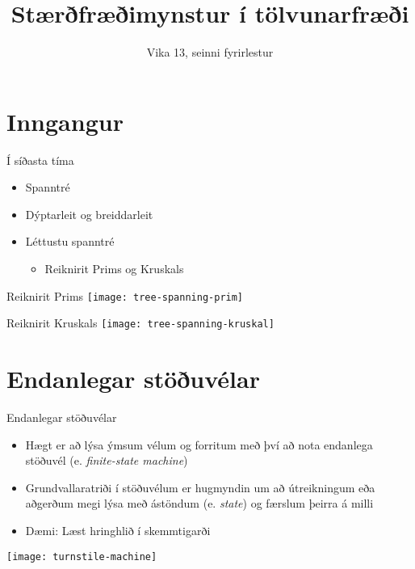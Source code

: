 \documentclass{beamer}
\title{Stærðfræðimynstur í tölvunarfræði}
\subtitle{Vika 13, seinni fyrirlestur}
\begin{document}
\begin{frame}
\titlepage
\end{frame}


\section{Inngangur}

\begin{frame}{Í síðasta tíma}
\begin{itemize}
 \item Spanntré
 \item Dýptarleit og breiddarleit
 \item Léttustu spanntré
 \begin{itemize}
  \item Reiknirit Prims og Kruskals
 \end{itemize}
\end{itemize}
\end{frame}

\begin{frame}{Reiknirit Prims}
\texttt{[image: tree-spanning-prim]}
\end{frame}

\begin{frame}{Reiknirit Kruskals}
\texttt{[image: tree-spanning-kruskal]}
\end{frame}


\section{Endanlegar stöðuvélar}

\begin{frame}{Endanlegar stöðuvélar}
\begin{itemize}
 \item Hægt er að lýsa ýmsum vélum og forritum með því að nota endanlega stöðuvél (e. \emph{finite-state machine})
 \item Grundvallaratriði í stöðuvélum er hugmyndin um að útreikningum eða aðgerðum megi lýsa með ástöndum (e. \emph{state}) og færslum þeirra á milli
 \item Dæmi: Læst hringhlið í skemmtigarði
\end{itemize}
\begin{center}
\texttt{[image: turnstile-machine]}
\end{center}
\end{frame}
\end{document}
